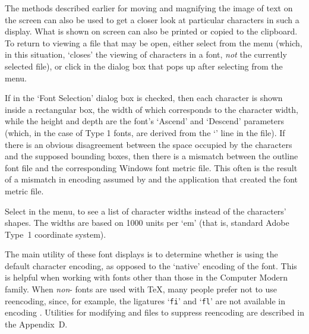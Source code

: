 The methods described earlier for moving and magnifying the image of
text on the screen can also be used to get a closer look at particular
characters in such a display.  
What is shown on screen can also be printed or copied to the clipboard.
To return to viewing a {\DVI} file that may be open, either select
 from the  menu 
(which, in this situation, `closes' the viewing of
characters in a font, {\it not\/} the currently selected {\DVI} file), 
or click  in the dialog box that pops up after selecting 
 from the  %
menu.

If  in the `Font Selection' %
dialog box is checked, 
then each character is shown inside a rectangular box, 
the width of which corresponds to the character width,
while the height and depth are the font's `Ascend' and `Descend' %
parameters
(which, in the case of Type 1 fonts,
are derived from the `' line in the {\PFB} file).
If there is an obvious disagreement between the space occupied by the
characters and the supposed bounding boxes,
then there is a mismatch between the outline font file
and the corresponding Windows font metric file.  
This often is the result of a mismatch in encoding assumed by {\ATM}
and the application that created the font metric file.

Select  in the  %
menu, to see a list of character widths instead of the characters' shapes.
The widths are based on 1000 units per `em' 
(that is, standard Adobe Type~1 coordinate system).

The main utility of these font displays is to determine %
whether {\ATM} is using the default {\ANSI} character encoding,
as opposed to the %
`native' encoding of the font.
%
This is helpful when working with fonts other than those in the
Computer Modern family.
When {\it non}-{\CM} fonts are used with {\TeX}, 
many people prefer not to use {\ANSI} reencoding,
since, for example, the ligatures `{\tt fi}' and `{\tt fl}' are not
available in {\ANSI} encoding%
. 
Utilities for modifying {\PFM} and {\PFB} files to suppress 
{\ANSI} reencoding are described in the Appendix~D. %

